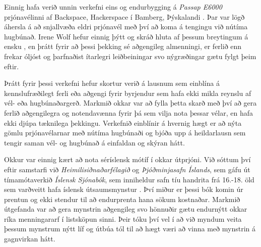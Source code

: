 \documentclass[a4paper,12pt,twoside]{article}
\begin{document}
Einnig hafa verið unnin verkefni eins og endurbygging á \textit{Passap E6000} prjónavélinni af Backspace, Hackerspace í Bamberg, Þýskalandi \cite{bamberg}. Þar var lögð áhersla á að snjallvæða eldri prjónavél með því að koma á tengingu við nútíma hugbúnað. Irene Wolf hefur einnig þýtt og skráð hluta af þessum breytingum á ensku  \cite{irene}, en þrátt fyrir að þessi þekking sé aðgengileg almenningi, er ferlið enn frekar óljóst og þarfnaðist ítarlegri leiðbeiningar svo nýgræðingar gætu fylgt þeim eftir.

Þrátt fyrir þessi verkefni hefur skortur verið á lausnum sem einblína á kennslufræðilegt ferli eða aðgengi fyrir byrjendur sem hafa ekki mikla reynslu af vél- eða hugbúnaðargerð. Markmið okkar var að fylla þetta skarð með því að gera ferlið aðgengilegra og notendavænna fyrir þá sem vilja nota þessar vélar, en hafa ekki djúpa tæknilega þekkingu. Verkefnið einblínir á hvernig hægt er að nýta gömlu prjónavélarnar með nútíma hugbúnaði og bjóða upp á heildarlausn sem tengir saman vél- og hugbúnað á einfaldan og skýran hátt.


Okkur var einnig kært að nota séríslensk mótíf í okkar útprjóni. Við sóttum því eftir samstarfi við \emph{Heimilisiðnaðarfélagið} og \emph{Þjóðminjasafn Íslands}, sem gáfu út tímamótaverkið \emph{Íslensk Sjónabók}, sem inniheldur safn tíu handrita frá 16.-18. öld sem varðveitt hafa íslensk útsaumsmynstur \cite{Sjonabok}. Því miður er þessi bók komin úr prentun og ekki stendur til að endurprenta hana sökum kostnaðar. Markmið útgefanda var að gera mynstrin aðgengileg svo hönnuðir gætu endurnýtt okkar ríka menningararf í listsköpun sinni. Þeir tóku því vel í að við myndum veita þessum mynstrum nýtt líf og útbúa tól til að hægt væri að vinna með mynstrin á gagnvirkan hátt.
\end{document}
